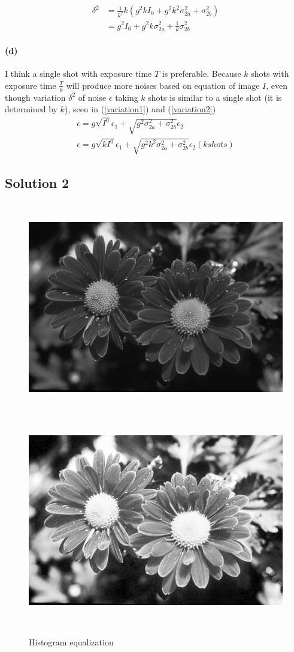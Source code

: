 \documentclass{article}
\newcommand{\solution}[1]{\clearpage \subsection*{Solution #1}}  %
\newcommand{\spart}[1]{\paragraph{(#1)}}
\begin{document}
\begin{align}
	\delta^2 &= \frac{1}{k^2}k\left(g^2kI_{0} + g^2k^2\sigma^2_{2a} + \sigma^2_{2b}\right)\\
	&= g^2I_{0} + g^2k\sigma^2_{2a} + \frac{1}{k}\sigma^2_{2b}
	\label{variation2}
\end{align}

\spart{d} 
I think a single shot with exposure time $T$ is preferable. Because $k$ shots with exposure time $\frac{T}{k}$ will produce more noises based on equation of image $I$, even though variation $\delta^2$ of noise $\epsilon$ taking $k$ shots is similar to a single shot (it is determined by $k$), seen in (\ref{variation1}) and (\ref{variation2})
\begin{align}
	\epsilon = g\sqrt{I^0}\epsilon_{1} + \sqrt{g^2\sigma^2_{2a} + \sigma^2_{2b}}\epsilon_{2}\\
	\epsilon = g\sqrt{kI^0}\epsilon_{1} + \sqrt{g^2k^2\sigma^2_{2a} + \sigma^2_{2b}}\epsilon_{2}    (k shots)
\end{align}

\solution{2}

\begin{figure}[h!]
  \centering
  	\includegraphics[height=25em]{code/inputs/p2_inp.png}
	\includegraphics[height=25em]{code/outputs/prob2.png}
  \caption{Histogram equalization}
\end{figure}
\end{document}
